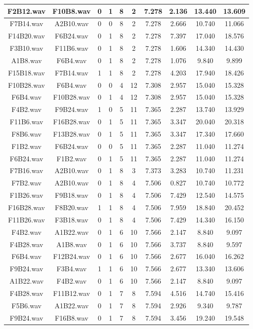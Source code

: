 \documentclass[11pt,a4paper,twoside]{book}
\begin{document}
\begin{longtable}[c]{|c|c|c|c|c|c|c|c|c|c|}
F2B12.wav&F10B8.wav&0&1&8&2&7.278&2.136&13.440&13.609\\ \hline
F7B14.wav&A2B10.wav&0&0&8&2&7.278&2.666&10.740&11.066\\ \hline
F14B20.wav&F6B24.wav&0&1&8&2&7.278&7.397&17.040&18.576\\ \hline
F3B10.wav&F11B6.wav&0&1&8&2&7.278&1.606&14.340&14.430\\ \hline
A1B8.wav&F6B4.wav&0&1&8&2&7.278&1.076&9.840&9.899\\ \hline
F15B18.wav&F7B14.wav&1&1&8&2&7.278&4.203&17.940&18.426\\ \hline
F10B28.wav&F6B4.wav&0&0&4&12&7.308&2.957&15.040&15.328\\ \hline
F6B4.wav&F10B28.wav&0&1&4&12&7.308&2.957&15.040&15.328\\ \hline
F4B2.wav&F9B24.wav&1&0&5&11&7.365&2.287&13.740&13.929\\ \hline
F11B6.wav&F16B28.wav&0&1&5&11&7.365&3.347&20.040&20.318\\ \hline
F8B6.wav&F13B28.wav&0&1&5&11&7.365&3.347&17.340&17.660\\ \hline
F1B2.wav&F6B24.wav&0&0&5&11&7.365&2.287&11.040&11.274\\ \hline
F6B24.wav&F1B2.wav&0&1&5&11&7.365&2.287&11.040&11.274\\ \hline
F7B16.wav&A2B10.wav&0&1&8&3&7.373&3.283&10.740&11.231\\ \hline
F7B2.wav&A2B10.wav&0&1&8&4&7.506&0.827&10.740&10.772\\ \hline
F1B26.wav&F9B18.wav&0&1&8&4&7.506&7.429&12.540&14.575\\ \hline
F16B28.wav&F8B20.wav&1&1&8&4&7.506&7.959&18.840&20.452\\ \hline
F11B26.wav&F3B18.wav&0&1&8&4&7.506&7.429&14.340&16.150\\ \hline
F4B2.wav&A1B22.wav&0&1&6&10&7.566&2.147&8.840&9.097\\ \hline
F4B28.wav&A1B8.wav&0&1&6&10&7.566&3.737&8.840&9.597\\ \hline
F6B4.wav&F12B24.wav&0&1&6&10&7.566&2.677&16.040&16.262\\ \hline
F9B24.wav&F3B4.wav&1&1&6&10&7.566&2.677&13.340&13.606\\ \hline
A1B22.wav&F4B2.wav&0&1&6&10&7.566&2.147&8.840&9.097\\ \hline
F4B28.wav&F11B12.wav&0&1&7&8&7.594&4.516&14.740&15.416\\ \hline
F5B6.wav&A1B22.wav&0&1&7&8&7.594&2.926&9.340&9.787\\ \hline
F9B24.wav&F16B8.wav&0&1&7&8&7.594&3.456&19.240&19.548\\ \hline

\end{longtable}
\end{document}
